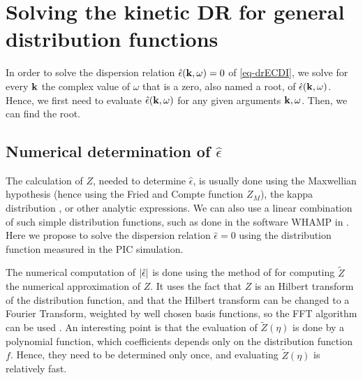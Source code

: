 
\section{Solving the kinetic \acs{DR} for general distribution functions}
  \label{sec-DR-solver}


  In order to solve the dispersion relation $\hat\epsilon({\mathbf k}, \omega) = 0$ of \cref{eq-drECDI}, we solve for every ${\mathbf k}$ the complex value of $\omega$ that is a zero, also named a root, of $\hat\epsilon({\mathbf k}, \omega)$.
  Hence, we first need to evaluate $\hat\epsilon({\mathbf k}, \omega)$ for any given arguments ${\mathbf k}, \omega$.
  Then, we can find the root.
  

  \subsection{Numerical determination of \texorpdfstring{$\hat\epsilon$}{the plasma dielectric function.}} \label{subsec-numepsilon}
  
  The calculation of $Z$, needed to determine $\hat{\epsilon}$, is usually done using the Maxwellian hypothesis \citep{cavalier2013} (hence using the Fried and Compte function $Z_M$), the kappa distribution \citep{ziebell2017}, or other analytic expressions.
  We can also use a linear combination of such simple distribution functions, such as done in the software WHAMP in \citet{ronnmark1982}.
  Here we propose to solve the dispersion relation $\hat{\epsilon}=0$ using the distribution function measured in the \ac{PIC} simulation.
  
  The numerical computation of $\lvert\hat\epsilon\rvert$ is done using the method of \citet{xie2013} for computing $\tilde{Z}$ the numerical approximation of $Z$. 
  It uses the fact that $Z$ is an Hilbert transform of the distribution function, and that the Hilbert transform can be changed to a Fourier Transform, weighted by well chosen basis functions, so the \ac{FFT} algorithm can be used \citep{weideman1995}.
  An interesting point is that the evaluation of $\tilde{Z}(\eta)$ is done by a polynomial function, which coefficients depends only on the distribution function $f$. 
  Hence, they need to be determined only once, and evaluating $\tilde{Z}(\eta)$ is relatively fast.
  

